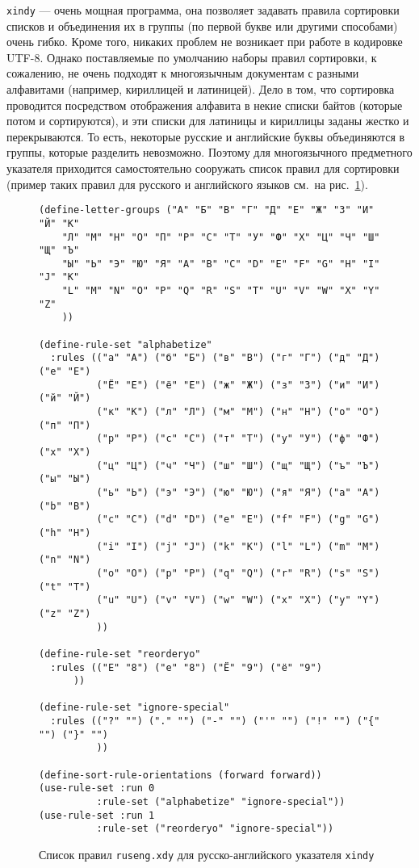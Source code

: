 \documentclass[a4paper,12pt]{article}
\begin{document}
\texttt{xindy} --- очень мощная программа, она позволяет задавать правила
сортировки списков и объединения их в группы (по первой букве или другими
способами) очень гибко. Кроме того, никаких проблем не возникает при работе
в кодировке UTF-8. Однако поставляемые по умолчанию наборы правил
сортировки, к сожалению, не очень подходят к многоязычным документам
с разными алфавитами (например, кириллицей и латиницей). Дело в том, что
сортировка проводится посредством отображения алфавита в некие списки
байтов (которые потом и сортируются), и эти списки для латиницы и кириллицы
заданы жестко и перекрываются. То есть, некоторые русские и английские буквы
объединяются в группы, которые разделить невозможно. Поэтому для многоязычного
предметного указателя приходится самостоятельно сооружать список правил для
сортировки (пример таких правил для русского и английского языков см.\ на
рис.~\ref{xindy1}).
\begin{figure}[tp]
\footnotesize
\begin{verbatim}
(define-letter-groups ("А" "Б" "В" "Г" "Д" "Е" "Ж" "З" "И" "Й" "К"
    "Л" "М" "Н" "О" "П" "Р" "С" "Т" "У" "Ф" "Х" "Ц" "Ч" "Ш" "Щ" "Ъ"
    "Ы" "Ь" "Э" "Ю" "Я" "A" "B" "C" "D" "E" "F" "G" "H" "I" "J" "K"
    "L" "M" "N" "O" "P" "Q" "R" "S" "T" "U" "V" "W" "X" "Y" "Z"
    ))

(define-rule-set "alphabetize"
  :rules (("а" "А") ("б" "Б") ("в" "В") ("г" "Г") ("д" "Д") ("е" "Е")
          ("Ё" "Е") ("ё" "Е") ("ж" "Ж") ("з" "З") ("и" "И") ("й" "Й")
          ("к" "К") ("л" "Л") ("м" "М") ("н" "Н") ("о" "О") ("п" "П")
          ("р" "Р") ("с" "С") ("т" "Т") ("у" "У") ("ф" "Ф") ("х" "Х")
          ("ц" "Ц") ("ч" "Ч") ("ш" "Ш") ("щ" "Щ") ("ъ" "Ъ") ("ы" "Ы")
          ("ь" "Ь") ("э" "Э") ("ю" "Ю") ("я" "Я") ("a" "A") ("b" "B")
          ("c" "C") ("d" "D") ("e" "E") ("f" "F") ("g" "G") ("h" "H")
          ("i" "I") ("j" "J") ("k" "K") ("l" "L") ("m" "M") ("n" "N")
          ("o" "O") ("p" "P") ("q" "Q") ("r" "R") ("s" "S") ("t" "T")
          ("u" "U") ("v" "V") ("w" "W") ("x" "X") ("y" "Y") ("z" "Z")
          ))

(define-rule-set "reorderyo"
  :rules (("Е" "8") ("е" "8") ("Ё" "9") ("ё" "9")
	  ))

(define-rule-set "ignore-special"
  :rules (("?" "") ("." "") ("-" "") ("'" "") ("!" "") ("{" "") ("}" "")
          ))

(define-sort-rule-orientations (forward forward))
(use-rule-set :run 0
	      :rule-set ("alphabetize" "ignore-special"))
(use-rule-set :run 1
	      :rule-set ("reorderyo" "ignore-special"))
\end{verbatim}
\caption{Список правил \texttt{ruseng.xdy} для русско-английского указателя \texttt{xindy}}\label{xindy1}
\end{figure}
\end{document}
